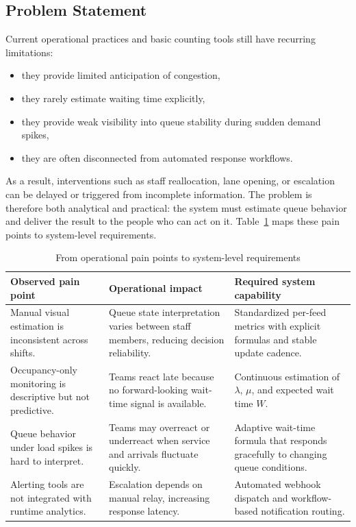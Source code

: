\subsection{Problem Statement}
Current operational practices and basic counting tools still have recurring limitations:
\begin{itemize}
    \item they provide limited anticipation of congestion,
    \item they rarely estimate waiting time explicitly,
    \item they provide weak visibility into queue stability during sudden demand spikes,
    \item they are often disconnected from automated response workflows.
\end{itemize}

As a result, interventions such as staff reallocation, lane opening, or escalation can be delayed or triggered from incomplete information. The problem is therefore both analytical and practical: the system must estimate queue behavior and deliver the result to the people who can act on it. Table~\ref{tab:painpoint_to_requirement} maps these pain points to system-level requirements.
\begin{table}[H]
    \centering
    \begingroup\setlength{\tabcolsep}{4pt}\renewcommand{\arraystretch}{0.95}\footnotesize
    \begin{tabularx}{\textwidth}{|X|X|X|}
        \hline
        Observed pain point & Operational impact & Required system capability \\ \hline
        Manual visual estimation is inconsistent across shifts. & Queue state interpretation varies between staff members, reducing decision reliability. & Standardized per-feed metrics with explicit formulas and stable update cadence. \\ \hline
        Occupancy-only monitoring is descriptive but not predictive. & Teams react late because no forward-looking wait-time signal is available. & Continuous estimation of $\lambda$, $\mu$, and expected wait time $W$. \\ \hline
        Queue behavior under load spikes is hard to interpret. & Teams may overreact or underreact when service and arrivals fluctuate quickly. & Adaptive wait-time formula that responds gracefully to changing queue conditions. \\ \hline
        Alerting tools are not integrated with runtime analytics. & Escalation depends on manual relay, increasing response latency. & Automated webhook dispatch and workflow-based notification routing. \\ \hline
    \end{tabularx}
    \caption{From operational pain points to system-level requirements}
    \label{tab:painpoint_to_requirement}
    \endgroup
\end{table}

